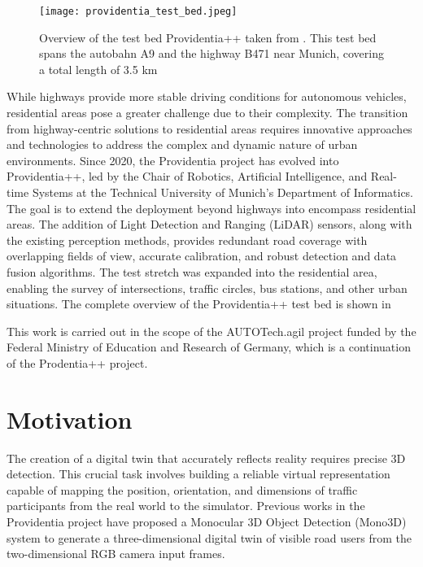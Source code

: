 \begin{figure}[htbp]
	\centering
	\texttt{[image: providentia\_test\_bed.jpeg]} 
	\caption{Overview of the test bed Providentia++ taken from \cite{a9dataset}. This test bed spans the autobahn A9 and the highway B471 near Munich, covering a total length of 3.5 km}
	\label{fig:providentia_test_bed}
\end{figure}

While highways provide more stable driving conditions for autonomous vehicles, residential areas pose a greater challenge due to their complexity. The transition from highway-centric solutions to residential areas requires innovative approaches and technologies to address the complex and dynamic nature of urban environments. Since 2020, the Providentia project has evolved into Providentia++, led by the Chair of Robotics, Artificial Intelligence, and Real-time Systems at the Technical University of Munich's Department of Informatics. The goal is to extend the deployment beyond highways into encompass residential areas. The addition of Light Detection and Ranging (LiDAR) sensors, along with the existing perception methods, provides redundant road coverage with overlapping fields of view, accurate calibration, and robust detection and data fusion algorithms. The test stretch was expanded into the residential area, enabling the survey of intersections, traffic circles, bus stations, and other urban situations. The complete overview of the Providentia++ test bed is shown in 

This work is carried out in the scope of the AUTOTech.agil project funded by the Federal Ministry of Education and Research of Germany, which is a continuation of the Prodentia++ project. 

\section{Motivation}

The creation of a digital twin that accurately reflects reality requires precise 3D detection. This crucial task involves building a reliable virtual representation capable of mapping the position, orientation, and dimensions of traffic participants from the real world to the simulator. Previous works in the Providentia project have proposed a Monocular 3D Object Detection (Mono3D) system to generate a three-dimensional digital twin of visible road users from the two-dimensional RGB camera input frames. 


